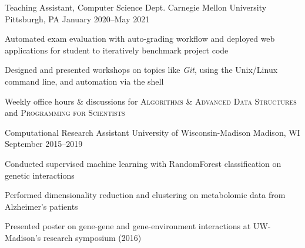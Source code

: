 \begin{cventries}
    \cventry
        {{\color{awesome}Teaching Assistant}, Computer Science Dept.}
        {Carnegie Mellon University}
        {Pittsburgh, PA}
        {January 2020--May 2021}
        {
            \begin{cvitems} 
                \item Automated exam evaluation with auto-grading workflow and deployed web applications for student to iteratively benchmark project code
                \item Designed and presented workshops on topics like \textit{Git}, using the Unix/Linux command line, and automation via the shell
                \item Weekly office hours \& discussions for {\bodyfont\scshape\color{darktext} Algorithms \& Advanced Data Structures} and {\bodyfont\scshape\color{darktext} Programming for Scientists} 
            \end{cvitems}
        }   

    \cventry
        {{\color{awesome}Computational Research Assistant}}
        {University of Wisconsin-Madison}
        {Madison, WI}
        {September 2015--2019}
        {
            \begin{cvitems} 
                \item Conducted supervised machine learning with RandomForest classification on genetic interactions
                \item Performed dimensionality reduction and clustering on metabolomic data from Alzheimer's patients
                \item Presented poster on gene-gene and gene-environment interactions at UW-Madison's research symposium (2016) 
            \end{cvitems}
        }

\end{cventries}
